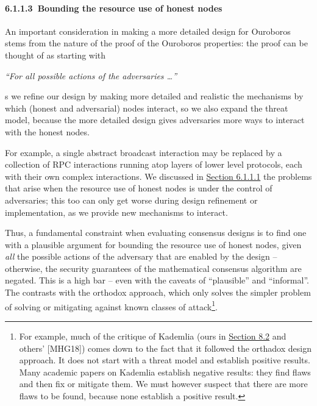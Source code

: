 \documentclass[11pt,a4paper]{article}
\begin{document}
\hypertarget{bounding-the-resource-use-of-honest-nodes}{%
\paragraph{​6.1.1.3​~Bounding the resource use of honest
nodes}\label{bounding-the-resource-use-of-honest-nodes}}

An important consideration in making a more detailed design for
Ouroboros stems from the nature of the proof of the Ouroboros
properties: the proof can be thought of as starting with

\emph{``For all possible actions of the adversaries \ldots{}'' }

s we refine our design by making more detailed and realistic the
mechanisms by which (honest and adversarial) nodes interact, so we also
expand the threat model, because the more detailed design gives
adversaries more ways to interact with the honest nodes.

For example, a single abstract broadcast interaction may be replaced by
a collection of RPC interactions running atop layers of lower level
protocols, each with their own complex interactions. We discussed in
\protect\hyperlink{the-ouroboros-specification}{{Section 6.1.1.1}} the
problems that arise when the resource use of honest nodes is under the
control of adversaries; this too can only get worse during design
refinement or implementation, as we provide new mechanisms to interact.

Thus, a fundamental constraint when evaluating consensus designs is to
find one with a plausible argument for bounding the resource use of
honest nodes, given \emph{all} the possible actions of the adversary
that are enabled by the design -- otherwise, the security guarantees of
the mathematical consensus algorithm are negated. This is a high bar --
even with the caveats of ``plausible'' and ``informal''. The contrasts
with the orthodox approach, which only solves the simpler problem of
solving or mitigating against known classes of attack\footnote{For
  example, much of the critique of Kademlia (ours in
  \protect\hyperlink{kademlia}{{Section 8.2}} and others' {[}MHG18{]})
  comes down to the fact that it followed the orthadox design approach.
  It does not start with a threat model and establish positive results.
  Many academic papers on Kademlia establish negative results: they find
  flaws and then fix or mitigate them. We must however suspect that
  there are more flaws to be found, because none establish a positive
  result.}.
\end{document}
